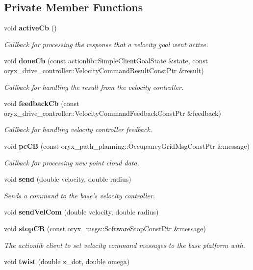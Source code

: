 \subsection*{\-Private \-Member \-Functions}
\begin{DoxyCompactItemize}
\item 
void {\bf active\-Cb} ()
\begin{DoxyCompactList}\small\item\em \-Callback for processing the response that a velocity goal went active. \end{DoxyCompactList}\item 
void {\bf done\-Cb} (const actionlib\-::\-Simple\-Client\-Goal\-State \&state, const oryx\-\_\-drive\-\_\-controller\-::\-Velocity\-Command\-Result\-Const\-Ptr \&result)
\begin{DoxyCompactList}\small\item\em \-Callback for handling the result from the velocity controller. \end{DoxyCompactList}\item 
void {\bf feedback\-Cb} (const oryx\-\_\-drive\-\_\-controller\-::\-Velocity\-Command\-Feedback\-Const\-Ptr \&feedback)
\begin{DoxyCompactList}\small\item\em \-Callback for handling velocity controller feedback. \end{DoxyCompactList}\item 
void {\bf pc\-C\-B} (const oryx\-\_\-path\-\_\-planning\-::\-Occupancy\-Grid\-Msg\-Const\-Ptr \&message)
\begin{DoxyCompactList}\small\item\em \-Callback for processing new point cloud data. \end{DoxyCompactList}\item 
void {\bf send} (double velocity, double radius)
\begin{DoxyCompactList}\small\item\em \-Sends a command to the base's velocity controller. \end{DoxyCompactList}\item 
void {\bf send\-Vel\-Com} (double velocity, double radius)
\item 
void {\bf stop\-C\-B} (const oryx\-\_\-msgs\-::\-Software\-Stop\-Const\-Ptr \&message)
\begin{DoxyCompactList}\small\item\em \-The actionlib client to set velocity command messages to the base platform with. \end{DoxyCompactList}\item 
void {\bf twist} (double x\-\_\-dot, double omega)
\end{DoxyCompactItemize}
